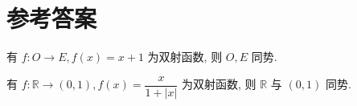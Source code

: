 \chapter{参考答案}

\begin{answer} \label{ans:odd-even-union}
  \begin{solution}
    有 $f: O \to E, f(x) = x + 1$ 为双射函数, 则 $O, E$ 同势.
  \end{solution}
\end{answer}

\begin{answer} \label{ans:real-number-interval}
  \begin{solution}
    有 $f: \mathbb{R} \to (0, 1), f(x) = \dfrac{x}{1 + |x|}$ 为双射函数, 则 $\mathbb{R}$ 与 $(0, 1)$ 同势.
  \end{solution}
\end{answer}
